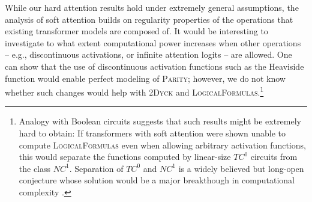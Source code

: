 \documentclass[11pt,a4paper]{article}
\begin{document}
While our hard attention results hold under extremely general assumptions, the analysis of soft attention builds on regularity properties of the operations that existing transformer models are composed of.
It would be interesting to investigate to what extent computational power increases when other operations -- e.g., discontinuous activations, or infinite attention logits -- are allowed.
One can show that the use of discontinuous activation functions such as the Heaviside function would enable perfect modeling of \textsc{Parity}; however, we do not know whether such changes would help with \textsc{2Dyck} and \textsc{LogicalFormulas}.\footnote{Analogy with Boolean circuits suggests that such results might be extremely hard to obtain: If transformers with soft attention were shown unable to compute \textsc{LogicalFormulas} even when allowing arbitrary activation functions, this would separate the functions computed by linear-size $TC^0$ circuits from the class $NC^1$. Separation of $TC^0$ and $NC^1$ is a widely believed but long-open conjecture whose solution would be a major breakthough in computational complexity \cite{arora2009computational}.} %








\end{document}
